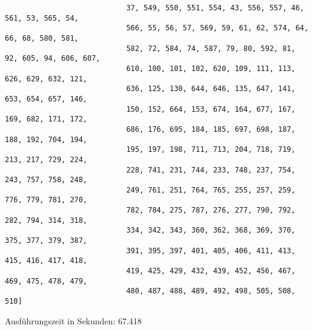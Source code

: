 \documentclass[a4paper,10pt,ngerman]{scrartcl}
\begin{document}
\begin{itemize}
\begin{verbatim}
                            37, 549, 550, 551, 554, 43, 556, 557, 46, 561, 53, 565, 54, 
                            566, 55, 56, 57, 569, 59, 61, 62, 574, 64, 66, 68, 580, 581, 
                            582, 72, 584, 74, 587, 79, 80, 592, 81, 92, 605, 94, 606, 607, 
                            610, 100, 101, 102, 620, 109, 111, 113, 626, 629, 632, 121, 
                            636, 125, 130, 644, 646, 135, 647, 141, 653, 654, 657, 146, 
                            150, 152, 664, 153, 674, 164, 677, 167, 169, 682, 171, 172, 
                            686, 176, 695, 184, 185, 697, 698, 187, 188, 192, 704, 194, 
                            195, 197, 198, 711, 713, 204, 718, 719, 213, 217, 729, 224, 
                            228, 741, 231, 744, 233, 748, 237, 754, 243, 757, 758, 248, 
                            249, 761, 251, 764, 765, 255, 257, 259, 776, 779, 781, 270, 
                            782, 784, 275, 787, 276, 277, 790, 792, 282, 794, 314, 318, 
                            334, 342, 343, 360, 362, 368, 369, 370, 375, 377, 379, 387, 
                            391, 395, 397, 401, 405, 406, 411, 413, 415, 416, 417, 418, 
                            419, 425, 429, 432, 439, 452, 456, 467, 469, 475, 478, 479, 
                            480, 487, 488, 489, 492, 498, 505, 508, 510]
  \end{verbatim}
  
  Ausführungszeit in Sekunden: 67.418
\end{itemize}
\end{document}
